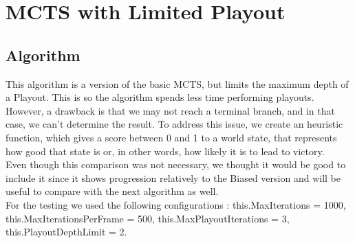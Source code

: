 \documentclass{article}
\begin{document}
  \section{MCTS with Limited Playout}

  \subsection{Algorithm}
  This algorithm is a version of the basic MCTS,  but limits the maximum depth of a Playout. This is so the algorithm spends less time performing playouts. However,
  a drawback is that we may not reach a terminal branch, and in that case, we can't determine the result. To address this issue, we create an heuristic function,
  which gives a score between 0 and 1 to a world state, that represents how good that state is or, in other words, how likely it is to lead to victory. \\
  Even though this comparison was not necessary, we thought it would be good to include it since it shows progression relatively to the Biased version and will be useful
  to compare with the next algorithm as well.\\
  For the testing we used the following configurations : this.MaxIterations = 1000, this.MaxIterationsPerFrame = 500, this.MaxPlayoutIterations = 3,
  this.PlayoutDepthLimit = 2.
  
  \newpage
\end{document}
